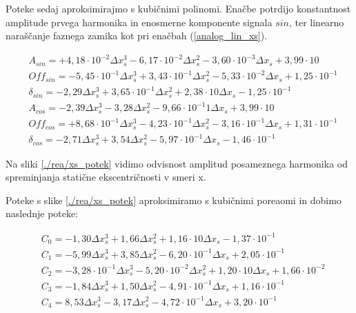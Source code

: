 

Poteke sedaj aproksimirajmo s kubičnimi polinomi. Enačbe potrdijo konstantnost amplitude prvega harmonika in enosmerne komponente signala $sin$, ter linearno naraščanje faznega zamika kot pri enačbah (\ref{analog_lin_xs}). 

\begin{eqnarray}
&A_{sin} = +4,18\cdot 10^{-2}\Delta x_s^3-6,17\cdot 10^{-2}\Delta x_s^2-3,60\cdot 10^{-3}\Delta x_s+3,99\cdot 10\\     
&Off_{sin} = -5,45\cdot 10^{-1}\Delta x_s^3+3,43\cdot 10^{-1}\Delta x_s^2-5,33\cdot 10^{-2}\Delta x_s+1,25\cdot 10^{-1}\\   
&\delta_{sin} = -2,29\Delta x_s^3+3,65\cdot 10^{-1}\Delta x_s^2+2,38\cdot 10\Delta x_s-1,25\cdot 10^{-1}\\
&A_{cos} = -2,39\Delta x_s^3-3,28\Delta x_s^2-9,66\cdot 10^{-1}1\Delta x_s+3,99\cdot 10\\     
&Off_{cos} = +8,68\cdot 10^{-1}\Delta x_s^3-4,23\cdot 10^{-1}\Delta x_s^2-3,16\cdot 10^{-1}\Delta x_s+1,31\cdot 10^{-1}\\   
&\delta_{cos} = -2,71\Delta x_s^3+3,54\Delta x_s^2-5,97\cdot 10^{-1}\Delta x_s-1,46\cdot 10^{-1}
\end{eqnarray}

\newpage

Na sliki \ref{./rea/xs_potek} vidimo odvisnost amplitud posameznega harmonika od spreminjanja statične ekscentričnosti v smeri x.


Poteke s slike \ref{./rea/xs_potek} aproksimiramo s kubičnimi poreaomi in dobimo naslednje poteke:


\begin{eqnarray}
&C_0 =-1,30\Delta x_s^{3}+1,66\Delta x_s^{2}+1,16\cdot 10\Delta x_s-1,37\cdot 10^{-1} \\                          
&C_1 =-5,99\Delta x_s^{3}+3,85\Delta x_s^{2}-6,20\cdot 10^{-1}\Delta x_s+2,05\cdot 10^{-1} \\                     
&C_2 =-3,28\cdot 10^{-1}\Delta x_s^{3}-5,20\cdot 10^{-2}\Delta x_s^{2}+1,20\cdot 10\Delta x_s+1,66\cdot 10^{-2} \\
&C_3 =-1,84\Delta x_s^{3}+1,50\Delta x_s^{2}-4,91\cdot 10^{-1}\Delta x_s+1,16\cdot 10^{-1} \\                     
&C_4 =8,53\Delta x_s^{3}-3,17\Delta x_s^{2}-4,72\cdot 10^{-1}\Delta x_s+3,20\cdot 10^{-1}
\end{eqnarray}

